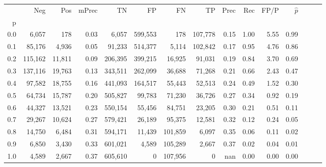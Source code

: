 \begin{tabular}{rrrrrrrrrrrrrrr}
\toprule
{} &      Neg &     Pos & mPrec &       TN &       FP &       FN &       TP &  Prec &   Rec &  FP/P & $\hat{p}$ \\
p   &          &         &       &          &          &          &          &       &       &       &           \\
\midrule
0.0 &    6,057 &     178 &  0.03 &    6,057 &  599,553 &      178 &  107,778 &  0.15 &  1.00 &  5.55 &      0.99 \\
0.1 &   85,176 &   4,936 &  0.05 &   91,233 &  514,377 &    5,114 &  102,842 &  0.17 &  0.95 &  4.76 &      0.86 \\
0.2 &  115,162 &  11,811 &  0.09 &  206,395 &  399,215 &   16,925 &   91,031 &  0.19 &  0.84 &  3.70 &      0.69 \\
0.3 &  137,116 &  19,763 &  0.13 &  343,511 &  262,099 &   36,688 &   71,268 &  0.21 &  0.66 &  2.43 &      0.47 \\
0.4 &   97,582 &  18,755 &  0.16 &  441,093 &  164,517 &   55,443 &   52,513 &  0.24 &  0.49 &  1.52 &      0.30 \\
0.5 &   64,734 &  15,787 &  0.20 &  505,827 &   99,783 &   71,230 &   36,726 &  0.27 &  0.34 &  0.92 &      0.19 \\
0.6 &   44,327 &  13,521 &  0.23 &  550,154 &   55,456 &   84,751 &   23,205 &  0.30 &  0.21 &  0.51 &      0.11 \\
0.7 &   29,267 &  10,624 &  0.27 &  579,421 &   26,189 &   95,375 &   12,581 &  0.32 &  0.12 &  0.24 &      0.05 \\
0.8 &   14,750 &   6,484 &  0.31 &  594,171 &   11,439 &  101,859 &    6,097 &  0.35 &  0.06 &  0.11 &      0.02 \\
0.9 &    6,850 &   3,430 &  0.33 &  601,021 &    4,589 &  105,289 &    2,667 &  0.37 &  0.02 &  0.04 &      0.01 \\
1.0 &    4,589 &   2,667 &  0.37 &  605,610 &        0 &  107,956 &        0 &   nan &  0.00 &  0.00 &      0.00 \\
\bottomrule
\end{tabular}
